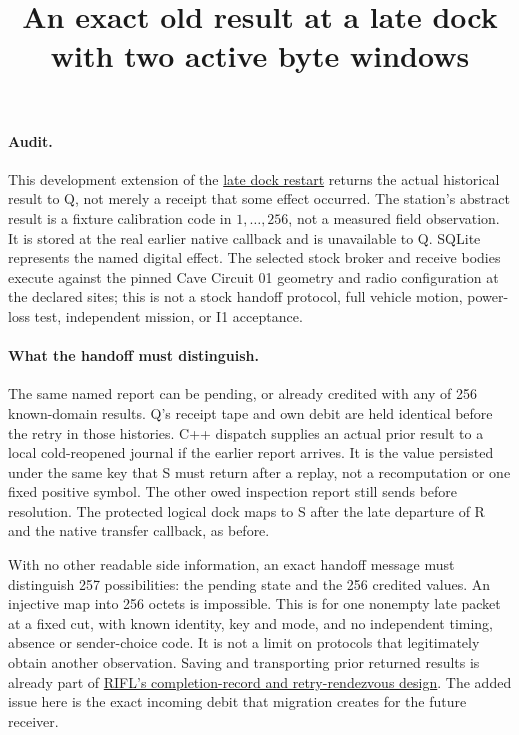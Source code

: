 \documentclass{article}
\title{An exact old result at a late dock with two active byte windows}
\author{}
\date{}
\begin{document}
\maketitle
\paragraph{Audit.}
This development extension of the
\href{https://github.com/eternal-november/eos-research-programmes/pull/801}{late dock restart}
returns the actual historical result to Q, not merely a receipt that
some effect occurred. The station's abstract result is a fixture
calibration code in \(1,\ldots,256\), not a measured field observation.
It is stored at the real earlier native callback and is unavailable to
Q. SQLite represents the named digital effect. The selected stock
broker and receive bodies execute against the pinned Cave Circuit 01
geometry and radio configuration at the declared sites; this is not a
stock handoff protocol, full vehicle motion, power-loss test,
independent mission, or I1 acceptance.

\paragraph{What the handoff must distinguish.}
The same named report can be pending, or already credited with any of
256 known-domain results. Q's receipt tape and own debit are held
identical before the retry in those histories. C++ dispatch supplies an
actual prior result to a local cold-reopened journal if the earlier
report arrives. It is the value persisted under the same key that S
must return after a replay, not a recomputation or one fixed positive
symbol. The other owed inspection report still sends before
resolution. The protected logical dock maps to S after the late
departure of R and the native transfer callback, as before.

With no other readable side information, an exact handoff message must
distinguish 257 possibilities: the pending state and the 256 credited
values. An injective map into 256 octets is impossible. This is for
one nonempty late packet at a fixed cut, with known identity, key
and mode, and no independent timing, absence or sender-choice code.
It is not a limit on protocols that legitimately obtain another
observation. Saving and transporting prior returned results is already
part of
\href{https://web.stanford.edu/~ouster/cgi-bin/papers/rifl.pdf}{RIFL's completion-record and retry-rendezvous design}.
The added issue here is the exact incoming debit that migration
creates for the future receiver.
\end{document}

